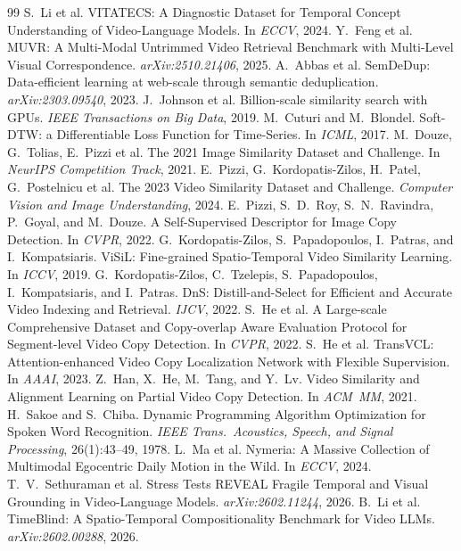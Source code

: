 \documentclass{article}
\theoremstyle{remark}
\begin{document}
\begin{thebibliography}{99}
 S.~Li et al. VITATECS: A Diagnostic Dataset for Temporal Concept Understanding of Video-Language Models. In \emph{ECCV}, 2024.
 Y.~Feng et al. MUVR: A Multi-Modal Untrimmed Video Retrieval Benchmark with Multi-Level Visual Correspondence. \emph{arXiv:2510.21406}, 2025.
 A.~Abbas et al. SemDeDup: Data-efficient learning at web-scale through semantic deduplication. \emph{arXiv:2303.09540}, 2023.
 J.~Johnson et al. Billion-scale similarity search with GPUs. \emph{IEEE Transactions on Big Data}, 2019.
 M.~Cuturi and M.~Blondel. Soft-{DTW}: a Differentiable Loss Function for Time-Series. In \emph{ICML}, 2017.
 M.~Douze, G.~Tolias, E.~Pizzi et al. The 2021 Image Similarity Dataset and Challenge. In \emph{NeurIPS Competition Track}, 2021.
 E.~Pizzi, G.~Kordopatis-Zilos, H.~Patel, G.~Postelnicu et al. The 2023 Video Similarity Dataset and Challenge. \emph{Computer Vision and Image Understanding}, 2024.
 E.~Pizzi, S.~D.~Roy, S.~N.~Ravindra, P.~Goyal, and M.~Douze. A Self-Supervised Descriptor for Image Copy Detection. In \emph{CVPR}, 2022.
 G.~Kordopatis-Zilos, S.~Papadopoulos, I.~Patras, and I.~Kompatsiaris. ViSiL: Fine-grained Spatio-Temporal Video Similarity Learning. In \emph{ICCV}, 2019.
 G.~Kordopatis-Zilos, C.~Tzelepis, S.~Papadopoulos, I.~Kompatsiaris, and I.~Patras. DnS: Distill-and-Select for Efficient and Accurate Video Indexing and Retrieval. \emph{IJCV}, 2022.
 S.~He et al. A Large-scale Comprehensive Dataset and Copy-overlap Aware Evaluation Protocol for Segment-level Video Copy Detection. In \emph{CVPR}, 2022.
 S.~He et al. TransVCL: Attention-enhanced Video Copy Localization Network with Flexible Supervision. In \emph{AAAI}, 2023.
 Z.~Han, X.~He, M.~Tang, and Y.~Lv. Video Similarity and Alignment Learning on Partial Video Copy Detection. In \emph{ACM~MM}, 2021.
 H.~Sakoe and S.~Chiba. Dynamic Programming Algorithm Optimization for Spoken Word Recognition. \emph{IEEE Trans.\ Acoustics, Speech, and Signal Processing}, 26(1):43--49, 1978.
 L.~Ma et al. Nymeria: A Massive Collection of Multimodal Egocentric Daily Motion in the Wild. In \emph{ECCV}, 2024.
 T.~V.~Sethuraman et al. Stress Tests REVEAL Fragile Temporal and Visual Grounding in Video-Language Models. \emph{arXiv:2602.11244}, 2026.
 B.~Li et al. TimeBlind: A Spatio-Temporal Compositionality Benchmark for Video LLMs. \emph{arXiv:2602.00288}, 2026.

\end{thebibliography}
\end{document}

